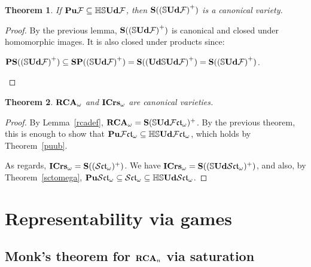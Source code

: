 \documentclass{article}
\theoremstyle{defin}
\theoremstyle{theorem}
\newtheorem{theorem}{Theorem}
\theoremstyle{claim}
\theoremstyle{prop}
\theoremstyle{lemma}
\theoremstyle{fact}
\theoremstyle{remark}
\theoremstyle{ex}
\theoremstyle{col}
\theoremstyle{question}
\begin{document}
\begin{theorem}
  If ${\bf Pu} \mathcal{F} \subseteq \mathbb{H} \mathbb{S} {\bf Ud} \mathcal{F}$,
  then ${\bf S}({(\mathbb{S} {\bf Ud} \mathcal{F})}^+)$ is a canonical variety.
\end{theorem}

\begin{proof}
  By the previous lemma, ${\bf S}({(\mathbb{S} {\bf Ud} \mathcal{F})}^+)$ is canonical and closed under homomorphic images.
  It is also closed under products since:

  \begin{center}
    ${\bf PS} ({(\mathbb{S} {\bf Ud} \mathcal{F})}^+) \subseteq {\bf SP} ({(\mathbb{S} {\bf Ud} \mathcal{F})}^+) = {\bf S} ({({\bf Ud} \mathbb{S} {\bf Ud} \mathcal{F})}^+) = {\bf S} ({(\mathbb{S} {\bf Ud} \mathcal{F})}^+)$.
  \end{center}
\end{proof}

\begin{theorem}
  ${\bf RCA}_{\omega}$ and ${\bf ICrs}_{\omega}$ are canonical varieties.
\end{theorem}

\begin{proof}
  By Lemma~\ref{rcadef}, ${\bf RCA}_{\omega} = {\bf S} (\mathbb{S} {\bf Ud} \mathcal{F}\mathfrak{ct}_{\omega})^+$.
  By the previous theorem, this is enough to show that 
  ${\bf Pu} \mathcal{F}\mathfrak{ct}_{\omega} \subseteq \mathbb{H} \mathbb{S} {\bf Ud} \mathcal{F}\mathfrak{ct}_{\omega}$,
  which holds by Theorem~\ref{puub}.

  As regards, ${\bf ICrs}_{\omega} = {\bf S} ((\mathcal{S}\mathfrak{ct}_{\omega})^+)$.
  We have ${\bf ICrs}_{\omega} = {\bf S} ((\mathbb{S} {\bf Ud} \mathcal{S}\mathfrak{ct}_{\omega})^+)$,
  and also, by Theorem~\ref{sctomega}, 
  ${\bf Pu} \mathcal{S}\mathfrak{ct}_{\omega} \subseteq \mathcal{S}\mathfrak{ct}_{\omega} \subseteq \mathbb{H} \mathbb{S} {\bf Ud} \mathcal{S}\mathfrak{ct}_{\omega}$.
\end{proof}

\section{Representability via games}

\subsection{Monk's theorem for ${\bf RCA}_n$ via saturation}
\end{document}
